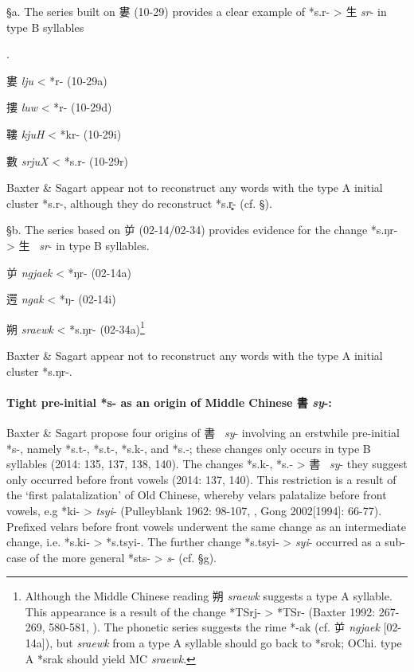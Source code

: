 §a. The series built on 婁 (10-29) provides a clear example of *s.r-
\textgreater{} 生  \emph{sr}- in type B syllables 

\citep[144]{Baxter2014OldChinese}.

\begin{description} \item
婁  \emph{lju} \textless{} *r- (10-29a)
 \item
摟  \emph{luw} \textless{} *r{}- (10-29d)
 \item
鞻  \emph{kjuH} \textless{} *kr- (10-29i)
 \item
數  \emph{srjuX} \textless{} *s.r- (10-29r)
\end{description}

Baxter \& Sagart appear not to reconstruct any words with the type A
initial cluster *s.r{}-, although they do reconstruct *s.r̥̥{}- (cf. §).

§b. The series based on 屰 (02-14/02-34) provides evidence for the
change *s.ŋr- \textgreater{} 生~ \emph{sr}- in type B syllables.

\begin{description} \item
屰  \emph{ngjaek} \textless{} *ŋr- (02-14a)
\item
遌  \emph{ngak} \textless{} *ŋ{}- (02-14i)
 \item
朔  \emph{sraewk} \textless{} *s.ŋr- (02-34a)\footnote{Although the
  Middle Chinese reading 朔 \emph{sraewk} suggests a type A syllable.
  This appearance is a result of the change *TSrj- \textgreater{} *TSr-
  (Baxter 1992: 267-269, 580-581, 
  \cite[225]{Baxter2014OldChinese}). The
  phonetic series suggests the rime *-ak (cf. 屰  \emph{ngjaek}
  {[}02-14a]), but \emph{sraewk} from a type A syllable should go back
  to *s{}rok; OChi. type A *s{}rak should yield MC \emph{sraewk}. }
\end{description}

Baxter \& Sagart appear not to reconstruct any words with the type A
initial cluster *s.ŋ{}r-.

\paragraph{Tight pre-initial *s- as
an origin of Middle Chinese 書  \emph{\textbf{sy}}\textbf{-:}}Baxter \&
Sagart propose four origins of 書~ \emph{sy}- involving an erstwhile
pre-initial *s-, namely *s.t-, *s.t{}-, *s.k-, and *s.{}-; these changes
only occurs in type B syllables (2014: 135, 137, 138, 140). The changes
*s.k-, *s.{}- \textgreater{} 書~ \emph{sy}- they suggest only occurred
before front vowels (2014: 137, 140). This restriction is a result of
the `first palatalization' of Old Chinese, whereby velars palatalize
before front vowels, e.g *ki- \textgreater{}  \emph{tsyi}- (Pulleyblank
1962: 98-107, 
\cite[210-213]{Baxter1992}, Gong 2002{[}1994]: 66-77).
Prefixed velars before front vowels underwent the same change as an
intermediate change, i.e. *s.ki- \textgreater{} *s.tsyi-. The further
change *s.tsyi- \textgreater{} \emph{syi}- occurred as a sub-case of the
more general *sts- \textgreater{} \emph{s}- (cf. §g).

